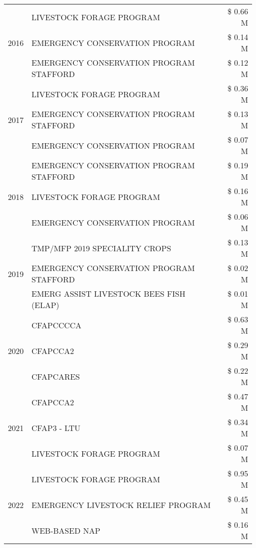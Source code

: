 \begin{tabular}{llr}
\cline{1-3}
\multirow[t]{3}{*}{2016} & LIVESTOCK FORAGE PROGRAM & \$ 0.66 M \\
 & EMERGENCY CONSERVATION PROGRAM & \$ 0.14 M \\
 & EMERGENCY CONSERVATION PROGRAM STAFFORD & \$ 0.12 M \\
\cline{1-3}
\multirow[t]{3}{*}{2017} & LIVESTOCK FORAGE PROGRAM & \$ 0.36 M \\
 & EMERGENCY CONSERVATION PROGRAM STAFFORD & \$ 0.13 M \\
 & EMERGENCY CONSERVATION PROGRAM & \$ 0.07 M \\
\cline{1-3}
\multirow[t]{3}{*}{2018} & EMERGENCY CONSERVATION PROGRAM STAFFORD & \$ 0.19 M \\
 & LIVESTOCK FORAGE PROGRAM & \$ 0.16 M \\
 & EMERGENCY CONSERVATION PROGRAM & \$ 0.06 M \\
\cline{1-3}
\multirow[t]{3}{*}{2019} & TMP/MFP 2019 SPECIALITY CROPS & \$ 0.13 M \\
 & EMERGENCY CONSERVATION PROGRAM STAFFORD & \$ 0.02 M \\
 & EMERG ASSIST LIVESTOCK BEES FISH (ELAP) & \$ 0.01 M \\
\cline{1-3}
\multirow[t]{3}{*}{2020} & CFAPCCCCA & \$ 0.63 M \\
 & CFAPCCA2 & \$ 0.29 M \\
 & CFAPCARES & \$ 0.22 M \\
\cline{1-3}
\multirow[t]{3}{*}{2021} & CFAPCCA2 & \$ 0.47 M \\
 & CFAP3 - LTU & \$ 0.34 M \\
 & LIVESTOCK FORAGE PROGRAM & \$ 0.07 M \\
\cline{1-3}
\multirow[t]{3}{*}{2022} & LIVESTOCK FORAGE PROGRAM & \$ 0.95 M \\
 & EMERGENCY LIVESTOCK RELIEF PROGRAM & \$ 0.45 M \\
 & WEB-BASED NAP & \$ 0.16 M \\
\cline{1-3}
\bottomrule
\end{tabular}

